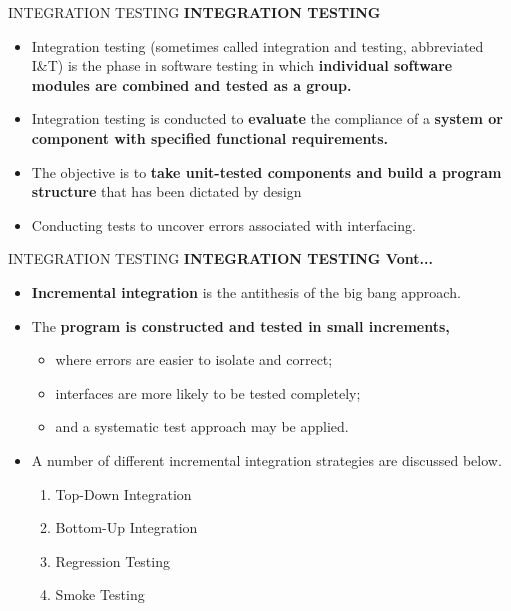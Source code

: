 \documentclass{beamer}
\begin{document}
\begin{frame}{INTEGRATION TESTING}
\textbf{INTEGRATION TESTING}
\begin{itemize}
	\item Integration testing (sometimes called integration and testing, abbreviated I\&T) is the phase in software testing in which\textbf{ individual software modules are combined and tested as a group. }
	\item Integration testing is conducted to\textbf{ evaluate }the compliance of a \textbf{system or component with specified functional requirements.}
	\item The 
	objective is to \textbf{take unit-tested components and build a program structure }that has been 
	dictated by design
	\item Conducting tests to uncover errors associated with interfacing. 
	
\end{itemize}
\end{frame}

\begin{frame}{INTEGRATION TESTING}
	\textbf{INTEGRATION TESTING Vont...}
	\begin{itemize}
		\item \textbf{Incremental integration} is the antithesis of the big bang approach. 
		\item The \textbf{program is constructed and tested in small increments, }
		\begin{itemize}
			\item where errors are easier to isolate and correct; 
			\item interfaces are more likely to be tested completely; 
			\item and a systematic test approach may be applied. 
		\end{itemize}
		\item A number of different incremental integration strategies are discussed below.
		\begin{enumerate}
			\item Top-Down Integration
			\item Bottom-Up Integration
			\item Regression Testing
			\item Smoke Testing
			
		\end{enumerate}
	\end{itemize}
\end{frame}
\end{document}
